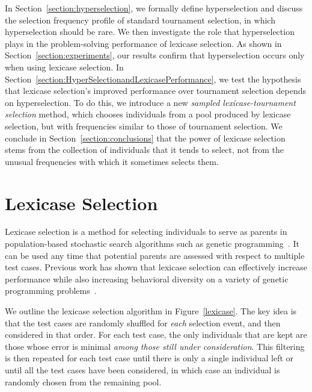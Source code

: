 \documentclass{sig-alternate}
\begin{document}
In Section~\ref{section:hyperselection}, we formally define hyperselection and discuss the selection frequency profile of standard tournament selection, in which hyperselection should be rare. We then investigate the role that hyperselection plays in the problem-solving performance of lexicase selection. As shown in Section~\ref{section:experiments}, our results confirm that hyperselection occurs only when using lexicase selection. In Section~\ref{section:HyperSelectionandLexicasePerformance}, we test the hypothesis that   lexicase selection's improved performance over tournament selection depends on hyperselection. To do this, we introduce a new \emph{sampled lexicase-tournament selection} method, which chooses individuals from a pool produced by lexicase selection, but with frequencies similar to those of tournament selection. We conclude in Section~\ref{section:conclusions} that the power of lexicase selection stems from the collection of individuals that it tends to select, not from the unusual frequencies with which it sometimes selects them.


\section{Lexicase Selection}
\label{section:lexicase}


Lexicase selection is a method for selecting individuals to serve as parents in population-based stochastic search algorithms such as genetic programming~\cite{Helmuth:2014:ieeeTEC, Spector:2012:GECCOcompANEW}. %
It can be used any time that potential parents are assessed with respect to multiple test cases.
Previous work has shown that lexicase selection can effectively increase performance while also increasing behavioral diversity on a variety of genetic programming problems~\cite{Helmuth:2015:GECCO, Helmuth:2014:ieeeTEC, Krawiec:2015:GECCO:smgpWorkshop, Helmuth:2015:GPTP}.

We outline the lexicase selection algorithm in Figure~\ref{lexicase}. The key idea is that the test cases are randomly shuffled for \emph{each} selection event, and then considered in that order. For each test case, the only individuals that are kept are those whose error is minimal \emph{among those still under consideration}. This filtering is then repeated for each test case until there is only a single individual left or until all the test cases have been considered, in which case an individual is randomly chosen from the remaining pool.
\end{document}
